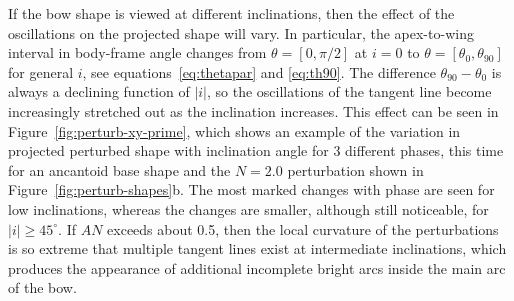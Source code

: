 If the bow shape is viewed at different inclinations, then the effect
of the oscillations on the projected shape will vary.  In particular,
the apex-to-wing interval in body-frame angle changes from
\(\theta = [0, \pi/2]\) at \(i = 0\) to
\(\theta = [\theta_0, \theta_{90}]\) for general \(i\), see
equations~\eqref{eq:thetapar} and \eqref{eq:th90}.  The difference
\(\theta_{90} - \theta_0\) is always a declining function of \(|i|\), so the
oscillations of the tangent line become increasingly stretched out as
the inclination increases.  This effect can be seen in
Figure~\ref{fig:perturb-xy-prime}, which shows an example of the
variation in projected perturbed shape with inclination angle for 3
different phases, this time for an ancantoid base shape and the
\(N = 2.0\) perturbation shown in Figure~\ref{fig:perturb-shapes}b.
The most marked changes with phase are seen for low inclinations,
whereas the changes are smaller, although still noticeable, for
\(|i| \ge 45^\circ\). If \(A N\) exceeds about 0.5, then the local curvature
of the perturbations is so extreme that multiple tangent lines exist
at intermediate inclinations, which produces the appearance of
additional incomplete bright arcs inside the main arc of the bow.


